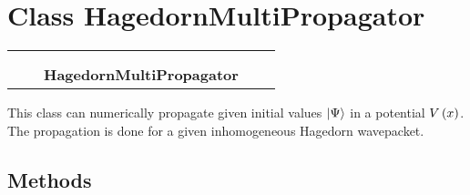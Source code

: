 
\section{Class HagedornMultiPropagator}

    \label{HagedornMultiPropagator:HagedornMultiPropagator}
\begin{tabular}{cccccc}
\multicolumn{2}{r}{\settowidth{\BCL}{Propagator}\multirow{2}{\BCL}{Propagator}}
&&
  \\\cline{3-3}
  &&\multicolumn{1}{c|}{}
&&
  \\
&&\multicolumn{2}{l}{\textbf{HagedornMultiPropagator}}
\end{tabular}

This class can numerically propagate given initial values
$\Ket{\Psi}$ in a potential
$V\left( x \right)$. The propagation is done for a given
inhomogeneous Hagedorn wavepacket.



  \subsection{Methods}

    \vspace{0.5ex}

